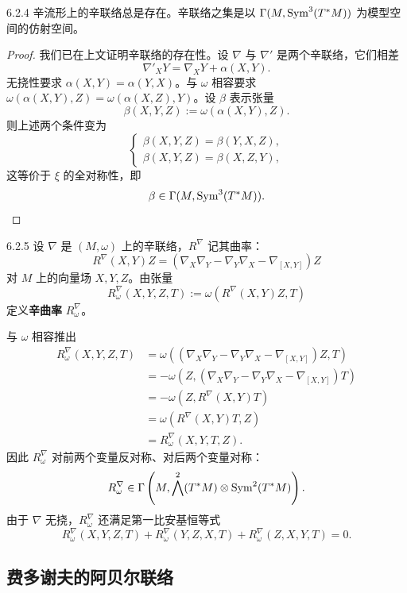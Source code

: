 \begin{theorem}{6.2.4}
  辛流形上的辛联络总是存在。辛联络之集是以 $\Gamma(M,\operatorname{Sym}^3(T^*M))$ 为模型空间的仿射空间。
\end{theorem}

\begin{proof}
  我们已在上文证明辛联络的存在性。设 $\nabla$ 与 $\nabla'$ 是两个辛联络，它们相差
  \[
  \nabla'_XY=\nabla_XY+\alpha(X,Y).
  \]
  无挠性要求 $\alpha(X,Y)=\alpha(Y,X)$。与 $\omega$ 相容要求
  $\omega(\alpha(X,Y),Z)=\omega(\alpha(X,Z),Y)$。设 $\beta$ 表示张量
  \[
  \beta(X,Y,Z):=\omega(\alpha(X,Y),Z).
  \]
  则上述两个条件变为
  \[
  \begin{cases}
  \beta(X,Y,Z)=\beta(Y,X,Z),\\
  \beta(X,Y,Z)=\beta(X,Z,Y),
  \end{cases}
  \]
  这等价于 $\xi$ 的全对称性，即
  \[
  \beta\in\Gamma(M,\operatorname{Sym}^3(T^*M)).
  \]
\end{proof}

\begin{definition}{6.2.5}
  设 $\nabla$ 是 $(M,\omega)$ 上的辛联络，$R^\nabla$ 记其曲率：
  \[
  R^\nabla(X,Y)Z=\left(\nabla_X\nabla_Y-\nabla_Y\nabla_X-\nabla_{[X,Y]}\right)Z
  \]
  对 $M$ 上的向量场 $X,Y,Z$。由张量
  \[
  R^\nabla_\omega(X,Y,Z,T):=\omega(R^\nabla(X,Y)Z,T)
  \]
  定义\textbf{辛曲率} $R^\nabla_\omega$。
\end{definition}

与 $\omega$ 相容推出
\begin{align*}
R^\nabla_\omega(X,Y,Z,T)
&=\omega\left(\left(\nabla_X\nabla_Y-\nabla_Y\nabla_X-\nabla_{[X,Y]}\right)Z,T\right)\\
&=-\omega\left(Z,\left(\nabla_X\nabla_Y-\nabla_Y\nabla_X-\nabla_{[X,Y]}\right)T\right)\\
&=-\omega\left(Z,R^\nabla(X,Y)T\right)\\
&=\omega\left(R^\nabla(X,Y)T,Z\right)\\
&=R^\nabla_\omega(X,Y,T,Z).
\end{align*}
因此 $R^\nabla_\omega$ 对前两个变量反对称、对后两个变量对称：
\[
R^\nabla_\omega\in\Gamma\left(M,\bigwedge^2(T^*M)\otimes\operatorname{Sym}^2(T^*M)\right).
\]
由于 $\nabla$ 无挠，$R^\nabla_\omega$ 还满足第一比安基恒等式
\[
R^\nabla_\omega(X,Y,Z,T)+R^\nabla_\omega(Y,Z,X,T)+R^\nabla_\omega(Z,X,Y,T)=0.
\]

\subsection{费多谢夫的阿贝尔联络}

